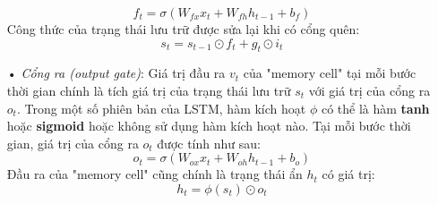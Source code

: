 \begin{itemize}
	\begin{equation} \label{forgetGateLSTM}
		f_t = \sigma \left(W_{fx}x_t + W_{fh}h_{t-1} + b_f \right)
	\end{equation}
	Công thức của trạng thái lưu trữ được sửa lại khi có cổng quên:
	\begin{equation} \label{cellStateWithForgetGateLSTM}
		s_t = s_{t-1} \odot f_t + g_t \odot i_t
	\end{equation}
	\item[•] \textit{Cổng ra (output gate)}: Giá trị đầu ra $v_t$ của "memory cell" tại mỗi bước thời gian chính là tích giá trị của trạng thái lưu trữ $s_t$ với giá trị của cổng ra $o_t$. Trong một số phiên bản của LSTM, hàm kích hoạt $\phi$ có thể là hàm \textbf{tanh} hoặc \textbf{sigmoid} hoặc không sử dụng hàm kích hoạt nào. Tại mỗi bước thời gian, giá trị của cổng ra $o_t$ được tính như sau:
	\begin{equation} \label{outputGateLSTM}
		o_t = \sigma \left(W_{ox}x_t + W_{oh}h_{t-1} + b_o \right)
	\end{equation}
	Đầu ra của "memory cell" cũng chính là trạng thái ẩn $h_t$ có giá trị:
	\begin{equation} \label{outputNodeLSTM}
		h_t = \phi(s_t) \odot o_t 
	\end{equation}
\end{itemize}






